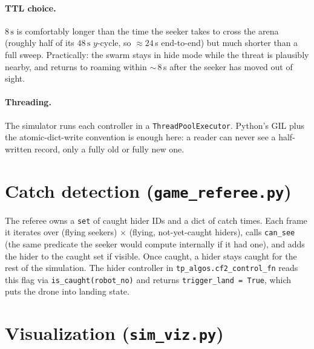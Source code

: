 \documentclass[11pt,a4paper]{article}
\newcommand{\code}[1]{\texttt{#1}}
\begin{document}
\paragraph{TTL choice.}
$8\,\text{s}$ is comfortably longer than the time the seeker takes to cross
the arena (roughly half of its $48\,\text{s}$ $y$-cycle, so $\approx 24$\,s
end-to-end) but much shorter than a full sweep. Practically: the swarm stays
in hide mode while the threat is plausibly nearby, and returns to roaming
within $\sim$\,8\,s after the seeker has moved out of sight.

\paragraph{Threading.}
The simulator runs each controller in a \code{ThreadPoolExecutor}. Python's
GIL plus the atomic-dict-write convention is enough here: a reader can never
see a half-written record, only a fully old or fully new one.

\section{Catch detection (\code{game\_referee.py})}

The referee owns a \code{set} of caught hider IDs and a dict of catch times.
Each frame it iterates over (flying seekers) $\times$ (flying, not-yet-caught
hiders), calls \code{can\_see} (the same predicate the seeker would compute
internally if it had one), and adds the hider to the caught set if visible.
Once caught, a hider stays caught for the rest of the simulation. The
hider controller in \code{tp\_algos.cf2\_control\_fn} reads this flag via
\code{is\_caught(robot\_no)} and returns \code{trigger\_land = True}, which
puts the drone into landing state.

\section{Visualization (\code{sim\_viz.py})}
\end{document}
